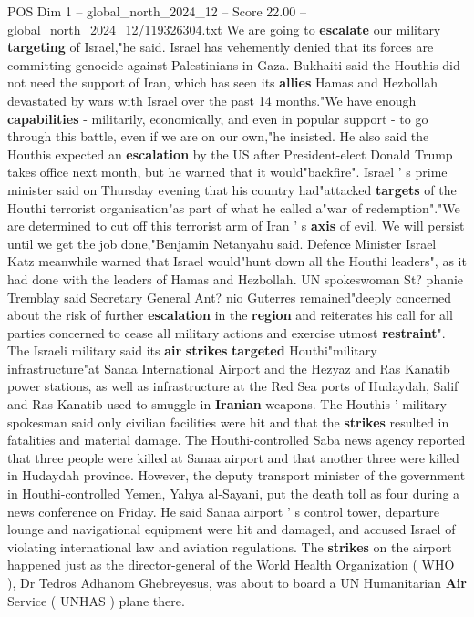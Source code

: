 \begin{textsample}{POS Dim 1 – global\_north\_2024\_12 – Score 22.00 – global\_north\_2024\_12/119326304.txt}
We are going to \textbf{escalate} our military \textbf{targeting} of Israel,"he said.
Israel has vehemently denied that its forces are committing genocide against Palestinians in Gaza.
Bukhaiti said the Houthis did not need the support of Iran, which has seen its \textbf{allies} Hamas and Hezbollah devastated by wars with Israel over the past 14 months."We have enough \textbf{capabilities} - militarily, economically, and even in popular support - to go through this battle, even if we are on our own,"he insisted.
He also said the Houthis expected an \textbf{escalation} by the US after President-elect Donald Trump takes office next month, but he warned that it would"backfire".
Israel ' s prime minister said on Thursday evening that his country had"attacked \textbf{targets} of the Houthi terrorist organisation"as part of what he called a"war of redemption"."We are determined to cut off this terrorist arm of Iran ' s \textbf{axis} of evil.
We will persist until we get the job done,"Benjamin Netanyahu said.
Defence Minister Israel Katz meanwhile warned that Israel would"hunt down all the Houthi leaders", as it had done with the leaders of Hamas and Hezbollah.
UN spokeswoman St? phanie Tremblay said Secretary General Ant? nio Guterres remained"deeply concerned about the risk of further \textbf{escalation} in the \textbf{region} and reiterates his call for all parties concerned to cease all military actions and exercise utmost \textbf{restraint}".
The Israeli military said its \textbf{air} \textbf{strikes} \textbf{targeted} Houthi"military infrastructure"at Sanaa International Airport and the Hezyaz and Ras Kanatib power stations, as well as infrastructure at the Red Sea ports of Hudaydah, Salif and Ras Kanatib used to smuggle in \textbf{Iranian} weapons.
The Houthis ' military spokesman said only civilian facilities were hit and that the \textbf{strikes} resulted in fatalities and material damage.
The Houthi-controlled Saba news agency reported that three people were killed at Sanaa airport and that another three were killed in Hudaydah province.
However, the deputy transport minister of the government in Houthi-controlled Yemen, Yahya al-Sayani, put the death toll as four during a news conference on Friday.
He said Sanaa airport ' s control tower, departure lounge and navigational equipment were hit and damaged, and accused Israel of violating international law and aviation regulations.
The \textbf{strikes} on the airport happened just as the director-general of the World Health Organization ( WHO ), Dr Tedros Adhanom Ghebreyesus, was about to board a UN Humanitarian \textbf{Air} Service ( UNHAS ) plane there.

\end{textsample}
